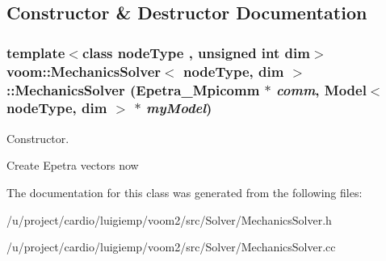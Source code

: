 \subsection{Constructor \& Destructor Documentation}
\hypertarget{classvoom_1_1_mechanics_solver_a78c3e2a12949f5ac7c0c8977c8e2adc0}{
\subsubsection[{MechanicsSolver}]{\setlength{\rightskip}{0pt plus 5cm}template$<$class nodeType , unsigned int dim$>$ {\bf voom::MechanicsSolver}$<$ nodeType, dim $>$::{\bf MechanicsSolver} (Epetra\_\-Mpicomm $\ast$ {\em comm}, \/  {\bf Model}$<$ nodeType, dim $>$ $\ast$ {\em myModel})}}
\label{classvoom_1_1_mechanics_solver_a78c3e2a12949f5ac7c0c8977c8e2adc0}


Constructor. 

Create Epetra vectors now 

The documentation for this class was generated from the following files:\begin{DoxyCompactItemize}
\item 
/u/project/cardio/luigiemp/voom2/src/Solver/MechanicsSolver.h\item 
/u/project/cardio/luigiemp/voom2/src/Solver/MechanicsSolver.cc\end{DoxyCompactItemize}
